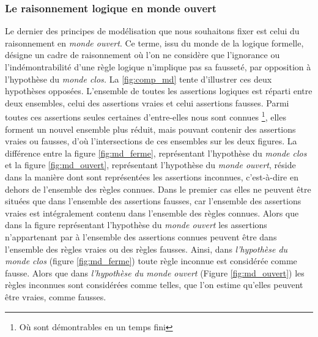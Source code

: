 \subsubsection{Le raisonnement logique en monde ouvert}

Le dernier des principes de modélisation que nous souhaitons fixer est
celui du raisonnement en \emph{monde ouvert}. Ce terme, issu du monde
de la logique formelle, désigne un cadre de raisonnement où l'on ne
considère que l'ignorance ou l'indémontrabilité d'une règle logique
n'implique pas sa fausseté, par opposition à l'hypothèse du
\emph{monde clos.} La \autoref{fig:comp_md} tente d'illustrer ces deux
hypothèses opposées. L'ensemble de toutes les assertions logiques est
réparti entre deux ensembles, celui des assertions vraies et celui
assertions fausses. Parmi toutes ces assertions seules certaines
d'entre-elles nous sont connues \footnote{Où sont démontrables en un
  temps fini}, elles forment un nouvel ensemble plus réduit, mais
pouvant contenir des assertions vraies ou fausses, d'où
l'intersections de ces ensembles sur les deux figures. La différence
entre la figure \ref{fig:md_ferme}, représentant l'hypothèse du
\emph{monde clos} et la figure \ref{fig:md_ouvert}, représentant
l'hypothèse du \emph{monde ouvert}, réside dans la manière dont sont
représentées les assertions inconnues, c'est-à-dire en dehors de
l'ensemble des règles connues. Dans le premier cas elles ne peuvent
être situées que dans l'ensemble des assertions fausses, car
l'ensemble des assertions vraies est intégralement contenu dans
l'ensemble des règles connues. Alors que dans la figure représentant
l'hypothèse du \emph{monde ouvert} les assertions n'appartenant par à
l'ensemble des assertions connues peuvent être dans l'ensemble des
règles vraies ou des règles fausses. Ainsi, dans \emph{l'hypothèse du
  monde clos} (figure \ref{fig:md_ferme}) toute règle inconnue est
considérée comme fausse. Alors que dans \emph{l'hypothèse du monde
  ouvert} (Figure \ref{fig:md_ouvert}) les règles inconnues sont
considérées comme telles, \ie que l'on estime qu'elles peuvent être
vraies, comme fausses.

